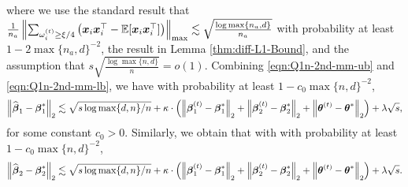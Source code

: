 where we use the standard result that $\frac{1}{n_a}\left\|\sum_{\omega_i^{(t)} \geq \xi/4} \big(\boldsymbol{x}_i\boldsymbol{x}_i^\top-\mathbb{E}[\boldsymbol{x}_i\boldsymbol{x}_i^{\top}]\big)\right\|_{\max} \lesssim \sqrt{\frac{\log \max\{n_a, d\}}{n_a}}$ with probability at least $1-2\max\{n_a, d\}^{-2}$, the result in Lemma  \ref{thm:diff-L1-Bound}, and the assumption that $s\sqrt{\frac{\log \max \{n, d\}}{n}}=o(1)$.
Combining \eqref{eqn:Q1n-2nd-mm-ub} and \eqref{eqn:Q1n-2nd-mm-lb}, we have with probability at least $1-c_0\max\{n, d\}^{-2}$, 
\begin{equation} \label{eqn:beta1-one-iter}
\left\lVert\widehat{\boldsymbol{\beta}}_1-\boldsymbol{\beta}_1^*\right\rVert_2 
\lesssim    
\sqrt{s \log  \max\{d, n\} / n}
+ \kappa\cdot\left( \left\lVert\boldsymbol{\beta}_1^{(t)} - \boldsymbol{\beta}_1^*\right\rVert_2 + \left\lVert\boldsymbol{\beta}_2^{(t)} - \boldsymbol{\beta}_2^*\right\rVert_2 + \left\lVert\boldsymbol{\theta}^{(t)} - \boldsymbol{\theta}^*\right\rVert_2 \right)
+ \lambda\sqrt{s},
\end{equation}
for some constant $c_0>0$.
Similarly, we obtain that with with probability at least $1-c_0\max\{n, d\}^{-2}$,
\begin{equation}\label{eqn:beta2-one-iter}
\left\lVert\widehat{\boldsymbol{\beta}}_2-\boldsymbol{\beta}_2^*\right\rVert_2
\lesssim \sqrt{s \log  \max\{d, n\} / n}
+ \kappa\cdot\left( \left\lVert\boldsymbol{\beta}_1^{(t)} - \boldsymbol{\beta}_1^*\right\rVert_2 + \left\lVert\boldsymbol{\beta}_2^{(t)} - \boldsymbol{\beta}_2^*\right\rVert_2 + \left\lVert\boldsymbol{\theta}^{(t)} - \boldsymbol{\theta}^*\right\rVert_2 \right)
+ \lambda\sqrt{s}.
\end{equation}

